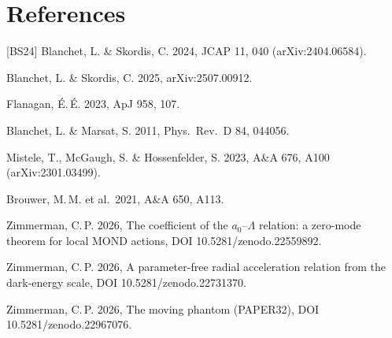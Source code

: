\documentclass[10pt]{article}
\begin{document}
\section*{References}
{\small
[BS24] Blanchet, L. \& Skordis, C. 2024, JCAP 11, 040 (arXiv:2404.06584).\par
[BS25] Blanchet, L. \& Skordis, C. 2025, arXiv:2507.00912.\par
[Fla23] Flanagan, \'E.\,\'E. 2023, ApJ 958, 107.\par
[BM11] Blanchet, L. \& Marsat, S. 2011, Phys.\ Rev.\ D 84, 044056.\par
[MMH23] Mistele, T., McGaugh, S. \& Hossenfelder, S. 2023, A\&A 676, A100 (arXiv:2301.03499).\par
[Bro21] Brouwer, M.\,M. et al.\ 2021, A\&A 650, A113.\par
[Z26a] Zimmerman, C.\,P. 2026, The coefficient of the $a_0$--$\Lambda$ relation: a zero-mode theorem for local MOND actions, DOI 10.5281/zenodo.22559892.\par
[Z26b] Zimmerman, C.\,P. 2026, A parameter-free radial acceleration relation from the dark-energy scale, DOI 10.5281/zenodo.22731370.\par
[Z26d] Zimmerman, C.\,P. 2026, The moving phantom (PAPER32), DOI 10.5281/zenodo.22967076.\par
}
\end{document}
